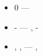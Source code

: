 \documentclass[a4paper]{article}
\newcommand\liststyleLiii{%
\renewcommand\labelitemi{{\textbullet}}
\renewcommand\labelitemii{${\circ}$}
\renewcommand\labelitemiii{${\blacksquare}$}
\renewcommand\labelitemiv{{\textbullet}}
}
\begin{document}
\liststyleLiii
\begin{itemize}
\item {
{\CYRE}{\cyrs}{\cyrl}{\cyri} {\cyrd}{\cyra}{\cyrn}{\cyrn}{\cyrery}{\cyrishrt}
{\cyrp}{\cyri}{\cyrk}{\cyrs}{\cyre}{\cyrl}{\cyrsftsn}
{\cyri}{\cyrz}{\cyro}{\cyrb}{\cyrr}{\cyra}{\cyrzh}{\cyre}{\cyrn}{\cyri}{\cyrya} {\cyri}{\cyrm}{\cyre}{\cyre}{\cyrt}
{\cyrz}{\cyrn}{\cyra}{\cyrch}{\cyre}{\cyrn}{\cyri}{\cyre} 0 --- {\cyrt}{\cyro}
{\cyrd}{\cyra}{\cyrn}{\cyrn}{\cyrery}{\cyrishrt} {\cyrp}{\cyri}{\cyrk}{\cyrs}{\cyre}{\cyrl}{\cyrsftsn}
{\cyrya}{\cyrv}{\cyrl}{\cyrya}{\cyre}{\cyrt}{\cyrs}{\cyrya} {\cyrch}{\cyra}{\cyrs}{\cyrt}{\cyrsftsn}{\cyryu}
{\cyrf}{\cyro}{\cyrn}{\cyra} {\cyri}
{\cyrs}{\cyrl}{\cyre}{\cyrd}{\cyro}{\cyrv}{\cyra}{\cyrt}{\cyre}{\cyrl}{\cyrsftsn}{\cyrn}{\cyro}
{\cyrn}{\cyri}{\cyrk}{\cyra}{\cyrk} {\cyrn}{\cyre}
{\cyrp}{\cyro}{\cyrm}{\cyre}{\cyrch}{\cyra}{\cyre}{\cyrt}{\cyrs}{\cyrya}}
\item {
{\CYRE}{\cyrs}{\cyrl}{\cyri}
{\cyrl}{\cyre}{\cyrv}{\cyrery}{\cyrishrt}-{\cyrv}{\cyre}{\cyrr}{\cyrh}{\cyrn}{\cyri}{\cyrishrt}
{\cyrp}{\cyri}{\cyrk}{\cyrs}{\cyre}{\cyrl}{\cyrsftsn} {\cyru}{\cyrzh}{\cyre}
{\cyrp}{\cyro}{\cyrm}{\cyre}{\cyrch}{\cyre}{\cyrn} --- {\cyrt}{\cyre}{\cyrk}{\cyru}{\cyrshch}{\cyri}{\cyrishrt}
{\cyrp}{\cyri}{\cyrk}{\cyrs}{\cyre}{\cyrl}{\cyrsftsn}
{\cyrp}{\cyro}{\cyrm}{\cyre}{\cyrch}{\cyra}{\cyre}{\cyrt}{\cyrs}{\cyrya} {\cyrt}{\cyro}{\cyrishrt} {\cyrzh}{\cyre}
{\cyrm}{\cyre}{\cyrt}{\cyrk}{\cyro}{\cyrishrt}, {\cyrch}{\cyrt}{\cyro} {\cyri}
{\cyrl}{\cyre}{\cyrv}{\cyrery}{\cyrishrt}-{\cyrv}{\cyre}{\cyrr}{\cyrh}{\cyrn}{\cyri}{\cyrishrt}}
\item {
{\CYRE}{\cyrs}{\cyrl}{\cyri} {\cyrl}{\cyri}{\cyrb}{\cyro} {\cyrv}{\cyre}{\cyrr}{\cyrh}{\cyrn}{\cyri}{\cyrishrt},
{\cyrl}{\cyri}{\cyrb}{\cyro} {\cyrl}{\cyre}{\cyrv}{\cyrery}{\cyrishrt}
{\cyrp}{\cyri}{\cyrk}{\cyrs}{\cyre}{\cyrl}{\cyrsftsn} {\cyru}{\cyrzh}{\cyre}
{\cyrp}{\cyro}{\cyrm}{\cyre}{\cyrch}{\cyre}{\cyrn}, {\cyra}
{\cyrd}{\cyri}{\cyra}{\cyrg}{\cyro}{\cyrn}{\cyra}{\cyrl}{\cyrsftsn}{\cyrn}{\cyrery}{\cyrishrt}
{\cyrya}{\cyrv}{\cyrl}{\cyrya}{\cyre}{\cyrt}{\cyrs}{\cyrya} {\cyrf}{\cyro}{\cyrn}{\cyro}{\cyrm} ---
{\cyrt}{\cyre}{\cyrk}{\cyru}{\cyrshch}{\cyri}{\cyrishrt} {\cyrp}{\cyri}{\cyrk}{\cyrs}{\cyre}{\cyrl}{\cyrsftsn}
{\cyrp}{\cyro}{\cyrm}{\cyre}{\cyrch}{\cyra}{\cyre}{\cyrt}{\cyrs}{\cyrya} {\cyrt}{\cyro}{\cyrishrt} {\cyrzh}{\cyre}
{\cyrm}{\cyre}{\cyrt}{\cyrk}{\cyro}{\cyrishrt}, {\cyrch}{\cyrt}{\cyro} {\cyri}
{\cyrp}{\cyro}{\cyrm}{\cyre}{\cyrch}{\cyre}{\cyrn}{\cyrn}{\cyrery}{\cyrishrt}
}
\end{itemize}
\end{document}
